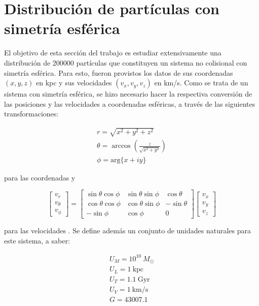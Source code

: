 \documentclass[final,5p,times,twocolumn, nopreprintline]{elsarticle}
\numberwithin{equation}{section}
\begin{document}



\section{Distribución de partículas con simetría esférica}

El objetivo de esta sección del trabajo es estudiar extensivamente una distribución de 200000 partículas que constituyen un sistema no colisional con simetría esférica. Para esto, fueron provistos los datos de sus coordenadas $(x,y,z)$ en kpc y sus velocidades $(v_x,v_y,v_z)$ en km/s. Como se trata de un sistema con simetría esférica, se hizo necesario hacer la respectiva conversión de las posiciones y las velocidades a coordenadas esféricas, a través de las siguientes transformaciones:

\begin{align}
r=\sqrt{x^2+y^2+z^2} \label{eq:r}\\
\theta = \arccos\left(\frac{z}{\sqrt{x^2+y^2}}\right) \label{eq:th}\\
\phi = \mathrm{arg}\{x+iy\} \label{eq:ph}
\end{align}

para las coordenadas y

\begin{equation}
\begin{bmatrix}
v_r\\v_\theta\\v_\phi
\end{bmatrix} = \begin{bmatrix}
\sin\theta\cos\phi & \sin\theta\sin\phi & \cos\theta\\
\cos\theta\cos\phi & \cos\theta\sin\phi & -\sin\theta\\
-\sin\phi & \cos\phi & 0
\end{bmatrix}\begin{bmatrix}
v_x\\v_y\\v_z
\end{bmatrix} \label{eq:velesf}
\end{equation}

para las velocidades \cite{soto2009fisica}. Se define además un conjunto de unidades naturales para este sistema, a saber:

\begin{align}
U_M = 10^10~M_\odot \label{eq:UM}\\
U_L = 1~\text{kpc} \label{eq:UL}\\
U_T = 1.1~\text{Gyr} \label{eq:UT}\\
U_V = 1~\text{km/s} \label{eq:UV}\\
G = 43007.1 \label{eq:G}
\end{align}
\end{document}
